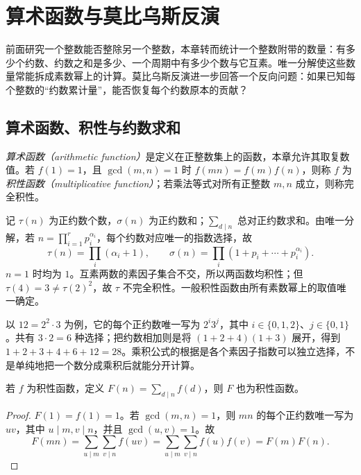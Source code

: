 \setcounter{chapter}{5} %
\chapter{算术函数与莫比乌斯反演}
\label{ch:arithmetic-functions}

前面研究一个整数能否整除另一个整数，本章转而统计一个整数附带的数量：有多少个约数、约数之和是多少、一个周期中有多少个数与它互素。唯一分解使这些数量常能拆成素数幂上的计算。莫比乌斯反演进一步回答一个反向问题：如果已知每个整数的“约数累计量”，能否恢复每个约数原本的贡献？

\section{算术函数、积性与约数求和}

\begin{definition}
\emph{算术函数（arithmetic function）}是定义在正整数集上的函数，本章允许其取复数值。若 $f(1)=1$，且 $\gcd(m,n)=1$ 时 $f(mn)=f(m)f(n)$，则称 $f$ 为\emph{积性函数（multiplicative function）}；若乘法等式对所有正整数 $m,n$ 成立，则称完全积性。
\end{definition}

记 $\tau(n)$ 为正约数个数，$\sigma(n)$ 为正约数和；$\sum_{d\mid n}$ 总对正约数求和。由唯一分解，若 $n=\prod_{i=1}^r p_i^{\alpha_i}$，每个约数对应唯一的指数选择，故
\begin{equation}
 \tau(n)=\prod_i(\alpha_i+1),\qquad
 \sigma(n)=\prod_i(1+p_i+\cdots+p_i^{\alpha_i}).
 \label{eq:divisor-functions}
\end{equation}
$n=1$ 时均为 $1$。互素两数的素因子集合不交，所以两函数均积性；但 $\tau(4)=3\ne\tau(2)^2$，故 $\tau$ 不完全积性。一般积性函数由所有素数幂上的取值唯一确定。

以 $12=2^2\cdot3$ 为例，它的每个正约数唯一写为 $2^i3^j$，其中 $i\in\{0,1,2\}$、$j\in\{0,1\}$。共有 $3\cdot2=6$ 种选择；把约数相加则是将 $(1+2+4)(1+3)$ 展开，得到 $1+2+3+4+6+12=28$。乘积公式的根据是各个素因子指数可以独立选择，不是单纯地把一个数分成乘积后就能分开计算。

\begin{proposition}[约数求和保持积性]
\label{prop:divisor-sum-multiplicative}
若 $f$ 为积性函数，定义 $F(n)=\sum_{d\mid n}f(d)$，则 $F$ 也为积性函数。
\end{proposition}
\begin{proof}
$F(1)=f(1)=1$。若 $\gcd(m,n)=1$，则 $mn$ 的每个正约数唯一写为 $uv$，其中 $u\mid m,v\mid n$，并且 $\gcd(u,v)=1$。故
\[
 F(mn)=\sum_{u\mid m}\sum_{v\mid n}f(uv)
 =\sum_{u\mid m}\sum_{v\mid n}f(u)f(v)=F(m)F(n).
\]
\end{proof}

